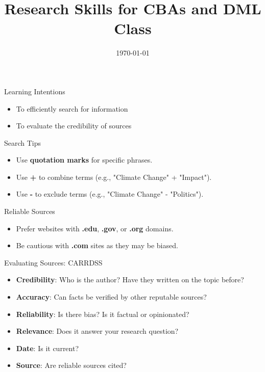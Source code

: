 \documentclass{beamer}
\title{\huge Research Skills for CBAs and DML Class}
\author{}
\date{\today}
\makeatletter
\newenvironment{myalert}{\begin{itemize}
[<+-| alert@+>]
}
{\end{itemize}}
\makeatother
\begin{document}
\begin{frame}
  \titlepage
\end{frame}

\begin{frame}{\huge Learning Intentions}
  \begin{myalert}
    \item To efficiently search for information
    \item To evaluate the credibility of sources
  \end{myalert}
\end{frame}

\begin{frame}{\huge Search Tips}
  \begin{myalert}
    \item Use \textbf{quotation marks} for specific phrases.
    \item Use \textbf{+} to combine terms (e.g., "Climate Change" + "Impact").
    \item Use \textbf{-} to exclude terms (e.g., "Climate Change" - "Politics").
  \end{myalert}
\end{frame}

\begin{frame}{\huge Reliable Sources}
  \begin{myalert}
    \item Prefer websites with \textbf{.edu}, \textbf{.gov}, or \textbf{.org} domains.
    \item Be cautious with \textbf{.com} sites as they may be biased.
  \end{myalert}
\end{frame}

\begin{frame}{\huge Evaluating Sources: CARRDSS}
  \begin{myalert}
    \item \textbf{Credibility}: Who is the author? Have they written on the topic before?
    \item \textbf{Accuracy}: Can facts be verified by other reputable sources?
    \item \textbf{Reliability}: Is there bias? Is it factual or opinionated?
    \item \textbf{Relevance}: Does it answer your research question?
    \item \textbf{Date}: Is it current?
    \item \textbf{Source}: Are reliable sources cited?
  \end{myalert}
\end{frame}
\end{document}
